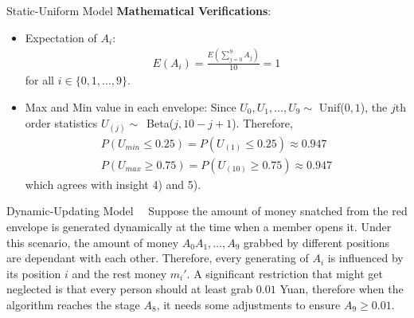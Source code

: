 \documentclass[12pt]{beamer}
\renewcommand{\[}{\begin{equation*} \begin{aligned}} %
\renewcommand{\]}{\end{aligned} \end{equation*}}
\begin{document}
\begin{frame}{Static-Uniform Model}
	\textbf{Mathematical Verifications}:
	\begin{itemize}
		\item Expectation of $A_i$:
			\[
				E(A_i) = \frac{E(\sum_{j=0}^{9} A_j)}{10} = 1
			\]
			for all $i \in \{0, 1, \dots ,9\}$.
		\item Max and Min value in each envelope: Since $U_0, U_1, \dots , U_9 \sim$ Unif($0, 1$), the $j$th order statistics $U_{(j)} \sim$~Beta($j, 10-j+1$). Therefore,
			\[
				P(U_{min} \le 0.25) = P(U_{(1)} \le 0.25) \approx 0.947 \\
				P(U_{max} \ge 0.75) = P(U_{(10)} \ge 0.75) \approx 0.947
			\]
			which agrees with insight 4) and 5).
	\end{itemize}
\end{frame}

\begin{frame}{Dynamic-Updating Model}
	\ \ Suppose the amount of money snatched from the red envelope is generated dynamically at the time when a member opens it. Under this scenario, the amount of money $A_0 A_1, \dots ,A_9$ grabbed by different positions are dependant with each other. Therefore, every generating of $A_i$ is influenced by its position $i$ and the rest money $m_i'$. A significant restriction that might get neglected is that every person should at least grab $0.01$ Yuan, therefore when the algorithm reaches the stage $A_8$, it needs some adjustments to ensure $A_9 \ge 0.01$.
\end{frame}
\end{document}
